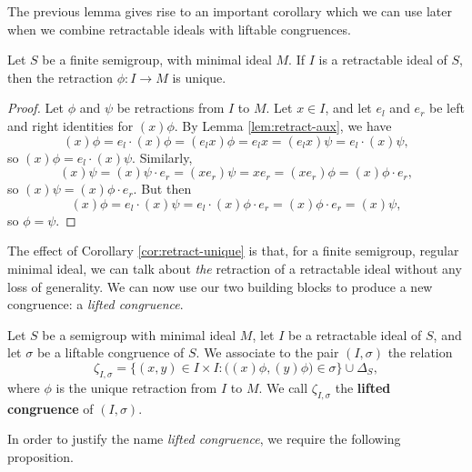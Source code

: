The previous lemma gives rise to an important corollary which we can use later
when we combine retractable ideals with liftable congruences.

\begin{corollary}
  \label{cor:retract-unique}
  Let $S$ be a finite semigroup, with minimal ideal $M$.  If $I$ is a
  retractable ideal of $S$, then the retraction $\phi:I \to M$ is unique.
  \begin{proof}
    Let $\phi$ and $\psi$ be retractions from $I$ to $M$.  Let $x \in I$,
    and let $e_l$ and $e_r$ be left and right identities for $(x)\phi$.  By
    Lemma \ref{lem:retract-aux}, we have
    $$(x)\phi
    = e_l \cdot (x)\phi
    = (e_lx)\phi
    = e_lx
    = (e_lx)\psi
    = e_l \cdot (x)\psi,$$
    so $(x)\phi = e_l \cdot (x)\psi$.  Similarly,
    $$(x)\psi
    = (x)\psi \cdot e_r
    = (xe_r)\psi
    = xe_r
    = (xe_r)\phi
    = (x)\phi \cdot e_r,$$
    so $(x)\psi = (x)\phi \cdot e_r$.  But then
    $$(x)\phi
    = e_l \cdot (x)\psi
    = e_l \cdot (x)\phi \cdot e_r
    = (x)\phi \cdot e_r
    = (x)\psi,$$
    so $\phi = \psi$.
  \end{proof}
\end{corollary}

The effect of Corollary \ref{cor:retract-unique} is that, for a finite
semigroup, regular minimal ideal, we can talk about \textit{the} retraction of a
retractable ideal without any loss of generality.  We can now use our two
building blocks to produce a new congruence: a \textit{lifted congruence}.

\begin{definition}
  \label{def:lifted-congruence}
  Let $S$ be a semigroup with minimal ideal $M$, let $I$ be a retractable
  ideal of $S$, and let $\sigma$ be a liftable congruence of $S$.  We associate
  to the pair $(I,\sigma)$ the relation
  $$\zeta_{I,\sigma} = \Big\{(x,y) \in I \times I :
  \big((x)\phi,(y)\phi\big) \in \sigma\Big\} \cup \Delta_S,$$
  where $\phi$ is the unique retraction from $I$ to $M$.
  We call $\zeta_{I,\sigma}$ the \textbf{lifted congruence} of $(I,\sigma)$.
\end{definition}

In order to justify the name \textit{lifted congruence}, we require the
following proposition.

